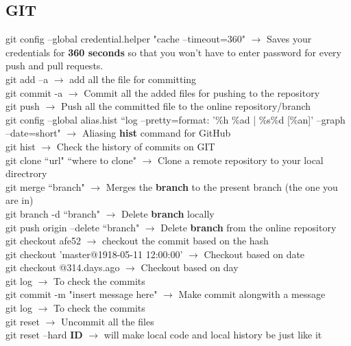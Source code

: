 \documentclass[twoside,a4paper]{article}
\newcommand{\tcb}{\color{blue}}
\newcommand{\tcc}{\color{cyan}}
\newcommand{\tcr}{\color{red}}
\newcommand{\tck}{\color{black}}
\newcommand{\ra }{$\rightarrow$ }
\newcommand{\hs}{\hspace}
\begin{document}
\begin{multicols}{2}
\tcc \section{GIT}

	\hs{-0.8 cm} \tcr  git config --global credential.helper
	 "cache --timeout=360" \tck \ra Saves your credentials
	 for \textbf{360 seconds} so that you won't have to enter password for
	 every push and pull requests.\\
	\tcr git add --a \tck \ra add all the
	 file for committing\\
	\tcr git commit -a \tck \ra Commit all the added
	 files for pushing to the repository \\
	\tcr git push \tck \ra Push all the committed 
	 file to the online repository/branch \\
	\tcr git \tcb config --global alias.hist 
	``log --pretty=format: '\%h \%ad | \%s\%d [\%an]' --graph --date=short"
	\tck \ra Aliasing \textbf{hist} command for GitHub\\
	\tcr git hist \tck \ra Check the history of
	commits on GIT\\
	\tcr git clone \tcb ``url" ``where to clone" 
	\tck  \ra Clone a remote repository to your local 
	directrory\\
	\tcr git merge \tcb ``branch" \tck $\rightarrow$
	Merges the \textbf{branch} to the present branch (the one you are in)\\
	\tcr git branch \tcb -d ``branch" \tck 
	\ra Delete \textbf{branch} locally\\
	\tcr git push \tcb origin --delete ``branch" \tck 
	\ra Delete \textbf{branch} from the online repository\\
	\tcr git checkout \tcb afe52 \tck \ra 
	checkout the commit based on the hash\\
	\tcr git checkout \tcb 'master@{1918-05-11 12:00:00}' 
	\tck \ra Checkout based on date\\
	\tcr git checkout \tcb @{314.days.ago}
	\tck \ra Checkout based on day\\
	\tcr git log \tck \ra To check the commits\\
	\tcr git commit \tcb -m "insert message here"\tck 
	\ra Make commit alongwith a message\\
	\tcr git log \tck \ra To check the commits\\
	\tcr git reset \tck \ra Uncommit all the files\\
	\tcr git reset \tcb --hard \textbf{ID} \tck 
	\ra will make local code and local history be just like it

\end{multicols}
\end{document}

